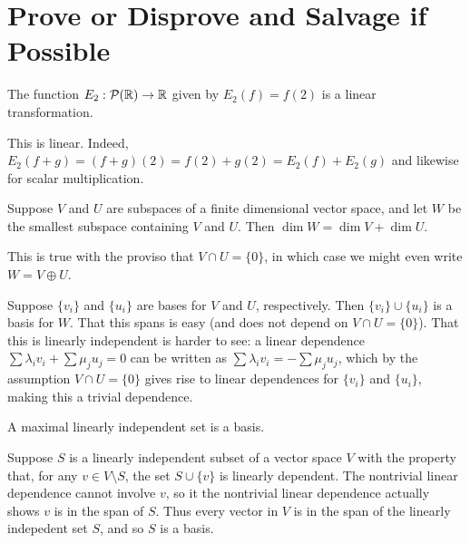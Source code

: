 \documentclass{homework}
\begin{document}
\section{Prove or Disprove and Salvage if Possible}

\begin{problem}
  The function $E_2 : \mathcal{P}(\mathbb{R}) \to \mathbb{R}$ given by $E_2(f) = f(2)$ is a linear transformation.
\end{problem}

\begin{solution}
  This is linear.  Indeed, $E_2(f + g) = (f+g)(2) = f(2) + g(2) = E_2(f) + E_2(g)$ and likewise for scalar multiplication.
\end{solution}

\begin{problem}
  Suppose $V$ and $U$ are subspaces of a finite dimensional vector
  space, and let $W$ be the smallest subspace containing $V$ and $U$.
  Then $\dim W = \dim V + \dim U$.
\end{problem}

\begin{solution}
  This is true with the proviso that $V \cap U = \{0\}$, in which case
  we might even write $W = V \oplus U$.

  Suppose $\{ v_i \}$ and $\{u_i\}$ are bases for $V$ and $U$,
  respectively.  Then $\{v_i\} \cup \{u_i\}$ is a basis for $W$.  That
  this spans is easy (and does not depend on $V \cap U = \{0\}$).
  That this is linearly independent is harder to see: a linear
  dependence $\sum \lambda_i v_i + \sum \mu_j u_j = 0$ can be written
  as $\sum \lambda_i v_i =-\sum \mu_j u_j$, which by the assumption
  $V \cap U = \{0\}$ gives rise to linear dependences for $\{v_i\}$
  and $\{u_i\}$, making this a trivial dependence.
\end{solution}

\begin{problem}
  A maximal linearly independent set is a basis.
\end{problem}

\begin{solution}
  Suppose $S$ is a linearly independent subset of a vector space $V$
  with the property that, for any $v \in V \setminus S$, the set
  $S \cup \{v\}$ is linearly dependent.  The nontrivial linear
  dependence cannot involve $v$, so it the nontrivial linear
  dependence actually shows $v$ is in the span of $S$.  Thus every
  vector in $V$ is in the span of the linearly indepedent set $S$, and
  so $S$ is a basis.
\end{solution}
\end{document}
